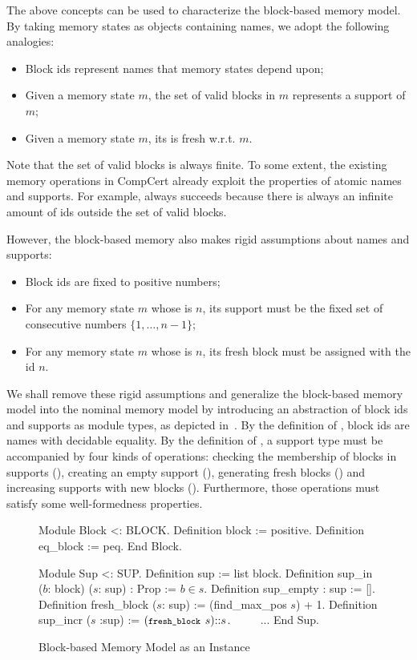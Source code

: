 The above concepts can be used to characterize the block-based
memory model. By taking memory states as objects containing names, 
we adopt the following analogies:
%
\begin{itemize}\itemsep 0pt
\item Block ids represent names that memory states depend upon;
\item Given a memory state $m$, the set of valid blocks in $m$
  represents a support of $m$;
\item Given a memory state $m$, its \nextblock is fresh w.r.t. $m$.
\end{itemize}
%
Note that the set of valid blocks is always finite. To some extent, the
existing memory operations in CompCert already exploit the properties
of atomic names and supports. For example,
 always succeeds because there is always an infinite amount
of ids outside the set of valid blocks.

However, the block-based memory also makes rigid assumptions
about names and supports:
%
\begin{itemize} \itemsep 0pt
\item Block ids are fixed to positive numbers;
\item For any memory state $m$ whose \nextblock is $n$, its support
  must be the fixed set of consecutive numbers $\{1,\ldots,n-1\}$;
\item For any memory state $m$ whose \nextblock is $n$, its fresh
  block must be assigned with the id $n$.
\end{itemize}
%

We shall remove these rigid assumptions and generalize the block-based
memory model into the nominal memory model by introducing an
abstraction of block ids and supports as module types, as depicted
in~.
%
By the definition of , block ids are names with decidable equality.
%
By the definition of , a support type must be accompanied by
four kinds
of operations: checking the membership of blocks in supports
(), creating an empty support (),
generating fresh blocks () and increasing supports
with new blocks (). Furthermore, those operations must
satisfy some well-formedness properties. 

\begin{figure}
\begin{coq}
  Module Block <: BLOCK.
    Definition block := positive.         Definition eq_block := peq.
  End Block.

  Module Sup <: SUP.
    Definition sup := list block.         Definition sup_in ($b$: block) ($s$: sup) : Prop := $b \in s$.
    Definition sup_empty : sup := [].     Definition fresh_block ($s$: sup) := (find_max_pos $s$) + 1.
    Definition sup_incr ($s$ :sup) := $(\texttt{\footnotesize fresh\_block }s) \mathit{::} s$.   $\qquad$ ...
  End Sup.  
\end{coq}  
  \vspace{-0.2cm}
  \caption{Block-based Memory Model as an Instance}
  \vspace{-0.1cm}
  \label{fig:bm-instance}
\end{figure}

